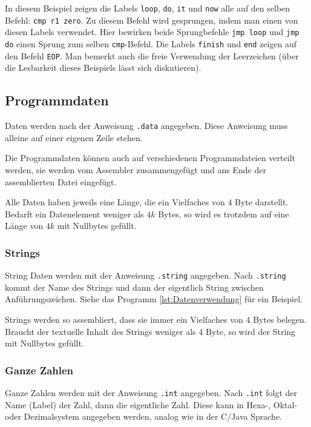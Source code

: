 In diesem Beispiel zeigen die Labels \texttt{loop}, \texttt{do}, \texttt{it} und
\texttt{now} alle auf den selben Befehl: \texttt{cmp r1 zero}. Zu diesem Befehl
wird gesprungen, indem man einen von diesen Labels verwendet. Hier bewirken
beide Sprungbefehle \texttt{jmp loop} und \texttt{jmp do} einen Sprung zum
selben \texttt{cmp}-Befehl. Die Labels \texttt{finish} und \texttt{end} zeigen
auf den Befehl \texttt{EOP}. Man bemerkt auch die freie Verwendung der
Leerzeichen (über die Lesbarkeit dieses Beispiels lässt sich diskutieren).


\subsection{Programmdaten}

Daten werden nach der Anweisung \texttt{.data} angegeben. Diese Anweisung muss
alleine auf einer eigenen Zeile stehen.

Die Programmdaten können auch auf
verschiedenen Programmdateien verteilt werden, sie werden vom Assembler
zusammengefügt und ans Ende der assemblierten Datei eingefügt.

Alle Daten haben jeweils eine Länge, die ein Vielfaches von 4 Byte darstellt.
Bedarft ein Datenelement weniger als $4k$ Bytes, so wird es trotzdem auf
eine Länge von $4 k$ mit Nullbytes gefüllt.

\subsubsection{Strings}

String Daten werden mit der Anweisung \texttt{.string} angegeben.
Nach \texttt{.string} kommt der Name des Strings und dann der eigentlich String
zwischen Anführungszeichen. Siehe das Programm \ref{lst:Datenverwendung} für
ein Beispiel.

Strings werden so assembliert, dass sie immer ein Vielfaches von 4 Bytes
belegen. Braucht der textuelle Inhalt des Strings weniger als 4 Byte, so wird
der String mit Nullbytes gefüllt.


\subsubsection{Ganze Zahlen}

Ganze Zahlen werden mit der Anweisung \texttt{.int} angegeben. Nach
\texttt{.int} folgt der Name (Label) der Zahl, dann die eigentliche Zahl. Diese
kann in Hexa-, Oktal- oder Dezimalsystem angegeben werden, analog wie in der
C/Java Sprache.

